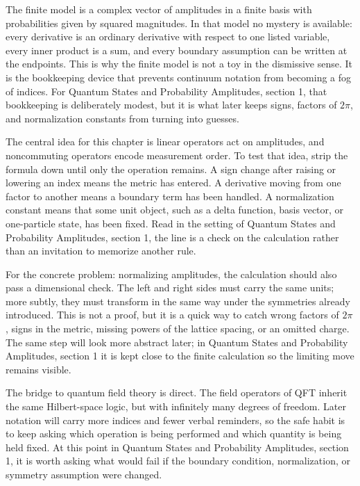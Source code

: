 The finite model is a complex vector of amplitudes in a finite basis with probabilities given by squared magnitudes.  In that model no mystery is available: every derivative is an ordinary derivative with respect to one listed variable, every inner product is a sum, and every boundary assumption can be written at the endpoints.  This is why the finite model is not a toy in the dismissive sense.  It is the bookkeeping device that prevents continuum notation from becoming a fog of indices.  For Quantum States and Probability Amplitudes, section 1, that bookkeeping is deliberately modest, but it is what later keeps signs, factors of \(2\pi\), and normalization constants from turning into guesses.

The central idea for this chapter is linear operators act on amplitudes, and noncommuting operators encode measurement order.  To test that idea, strip the formula down until only the operation remains.  A sign change after raising or lowering an index means the metric has entered.  A derivative moving from one factor to another means a boundary term has been handled.  A normalization constant means that some unit object, such as a delta function, basis vector, or one-particle state, has been fixed.  Read in the setting of Quantum States and Probability Amplitudes, section 1, the line is a check on the calculation rather than an invitation to memorize another rule.

For the concrete problem: normalizing amplitudes, the calculation should also pass a dimensional check.  The left and right sides must carry the same units; more subtly, they must transform in the same way under the symmetries already introduced.  This is not a proof, but it is a quick way to catch wrong factors of \(2\pi\), signs in the metric, missing powers of the lattice spacing, or an omitted charge.  The same step will look more abstract later; in Quantum States and Probability Amplitudes, section 1 it is kept close to the finite calculation so the limiting move remains visible.

The bridge to quantum field theory is direct.  The field operators of QFT inherit the same Hilbert-space logic, but with infinitely many degrees of freedom.  Later notation will carry more indices and fewer verbal reminders, so the safe habit is to keep asking which operation is being performed and which quantity is being held fixed.  At this point in Quantum States and Probability Amplitudes, section 1, it is worth asking what would fail if the boundary condition, normalization, or symmetry assumption were changed.

